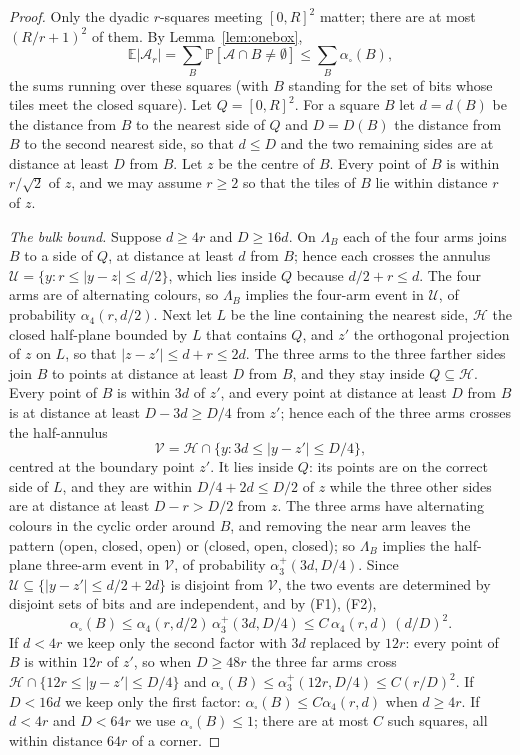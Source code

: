 \documentclass[11pt]{amsart}
\theoremstyle{remark}
\newcommand{\PP}{\mathbb{P}}
\newcommand{\EE}{\mathbb{E}}
\begin{document}
\begin{proof}
Only the dyadic $r$-squares meeting $[0,R]^2$ matter; there are at most $(R/r+1)^2$ of them. By Lemma~\ref{lem:onebox},
\begin{equation}\label{eq:sumbox}
\EE|\mathcal A_r|=\sum_{B}\PP[\mathcal A\cap B\ne\emptyset]\le\sum_{B}\alpha_\square(B),
\end{equation}
the sums running over these squares (with $B$ standing for the set of bits whose tiles meet the closed square). Let $Q=[0,R]^2$. For a square $B$ let $d=d(B)$ be the distance from $B$ to the nearest side of $Q$ and $D=D(B)$ the distance from $B$ to the second nearest side, so that $d\le D$ and the two remaining sides are at distance at least $D$ from $B$. Let $z$ be the centre of $B$. Every point of $B$ is within $r/\sqrt2$ of $z$, and we may assume $r\ge2$ so that the tiles of $B$ lie within distance $r$ of $z$.

\emph{The bulk bound.} Suppose $d\ge4r$ and $D\ge16d$. On $\Lambda_B$ each of the four arms joins $B$ to a side of $Q$, at distance at least $d$ from $B$; hence each crosses the annulus $\mathcal U=\{y:r\le|y-z|\le d/2\}$, which lies inside $Q$ because $d/2+r\le d$. The four arms are of alternating colours, so $\Lambda_B$ implies the four-arm event in $\mathcal U$, of probability $\alpha_4(r,d/2)$. Next let $L$ be the line containing the nearest side, $\mathcal H$ the closed half-plane bounded by $L$ that contains $Q$, and $z'$ the orthogonal projection of $z$ on $L$, so that $|z-z'|\le d+r\le 2d$. The three arms to the three farther sides join $B$ to points at distance at least $D$ from $B$, and they stay inside $Q\subseteq\mathcal H$. Every point of $B$ is within $3d$ of $z'$, and every point at distance at least $D$ from $B$ is at distance at least $D-3d\ge D/4$ from $z'$; hence each of the three arms crosses the half-annulus
\[
\mathcal V=\mathcal H\cap\{y:3d\le|y-z'|\le D/4\},
\]
centred at the boundary point $z'$. It lies inside $Q$: its points are on the correct side of $L$, and they are within $D/4+2d\le D/2$ of $z$ while the three other sides are at distance at least $D-r>D/2$ from $z$. The three arms have alternating colours in the cyclic order around $B$, and removing the near arm leaves the pattern (open, closed, open) or (closed, open, closed); so $\Lambda_B$ implies the half-plane three-arm event in $\mathcal V$, of probability $\alpha_3^+(3d,D/4)$. Since $\mathcal U\subseteq\{|y-z'|\le d/2+2d\}$ is disjoint from $\mathcal V$, the two events are determined by disjoint sets of bits and are independent, and by (F1), (F2),
\begin{equation}\label{eq:bulk}
\alpha_\square(B)\le\alpha_4(r,d/2)\,\alpha_3^+(3d,D/4)\le C\,\alpha_4(r,d)\,(d/D)^2.
\end{equation}
If $d<4r$ we keep only the second factor with $3d$ replaced by $12r$: every point of $B$ is within $12r$ of $z'$, so when $D\ge 48r$ the three far arms cross $\mathcal H\cap\{12r\le|y-z'|\le D/4\}$ and $\alpha_\square(B)\le\alpha_3^+(12r,D/4)\le C(r/D)^2$. If $D<16d$ we keep only the first factor: $\alpha_\square(B)\le C\alpha_4(r,d)$ when $d\ge4r$. If $d<4r$ and $D<64r$ we use $\alpha_\square(B)\le1$; there are at most $C$ such squares, all within distance $64r$ of a corner.


\end{proof}
\end{document}
